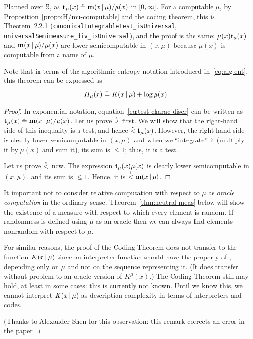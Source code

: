 \begin{formalization}
Planned over $\mathbb{S}$, as $\mathbf{t}_{\mu}(x)\stackrel{{}_*}{=}\mathbf{m}(x \,\vert\, \mu)/\mu(x)$ in $[0,\infty]$. For a
computable $\mu$, by Proposition~\ref{propo:H/mu-computable} and the coding theorem, this is
Theorem~2.2.1 (\texttt{canonicalIntegrableTest\_isUniversal},
\texttt{universalSemimeasure\_div\_isUniversal}), and the proof is the same: $\mu(x)\mathbf{t}_{\mu}(x)$
and $\mathbf{m}(x \,\vert\, \mu)/\mu(x)$ are lower semicomputable in $(x,\mu)$ because $\mu(x)$ is
computable from a name of $\mu$.
\end{formalization}
Note that in terms of the algorithmic entropy notation introduced 
in~\eqref{eq:alg-ent}, this theorem can be expressed as
 \[
   H_{\mu}(x) \stackrel{{}_+}{=} K(x \,\vert\, \mu) + \log\mu(x).
 \]
 \begin{proof}
In exponential notation, equation~\eqref{eq:test-charac-discr} can be
written as \( \mathbf{t}_{\mu}(x) \stackrel{{}_*}{=} \mathbf{m}(x \,\vert\, \mu)/\mu(x) \).
Let us prove \( \stackrel{{}_*}{>} \) first.
We will show that the right-hand side of this inequality is a test, and
hence \( \stackrel{{}_*}{<} \mathbf{t}_{\mu}(x) \).
However, 
the right-hand side is clearly lower semicomputable in \( (x, \mu) \) and
when we ``integrate'' it (multiply it by \( \mu(x) \) and sum it), its sum is
\( \le 1 \); thus, it is a test.

Let us prove \( \stackrel{{}_*}{<} \) now.
The expression \( \mathbf{t}_{\mu}(x)\mu(x) \) is clearly lower semicomputable in
\( (x,\mu) \), and its sum is \( \le 1 \).
Hence, it is \( \stackrel{{}_+}{<} \mathbf{m}(x \,\vert\, \mu) \).
 \end{proof}

 \begin{remark}\label{rem:oracle-warning}
It important not to consider relative computation with respect to \( \mu \) 
as \emph{oracle computation} in the ordinary sense.
Theorem~\ref{thm:neutral-meas} below will show the existence of a measure with
respect to which every element is random.
If randomness is defined using \( \mu \) as an oracle then we can always find
elements nonrandom with respect to \( \mu \).

For similar reasons, the proof of the Coding Theorem does not transfer to the
function \( K(x\,\vert\, \mu) \) 
since an interpreter function should have the property of ,
depending only on \( \mu \) and not on the sequence representing it.
(It does transfer without problem to an oracle version of \( K^{\mu}(x) \).)
The Coding Theorem still may hold, at least in some cases: this is currently not
known.
Until we know this, we cannot interpret \( K(x\,\vert\, \mu) \) as description complexity
in terms of interpreters and codes.

(Thanks to Alexander Shen for this observation: this remark corrects
an error in the paper~\cite{GacsUnif05}.)
 \end{remark}


